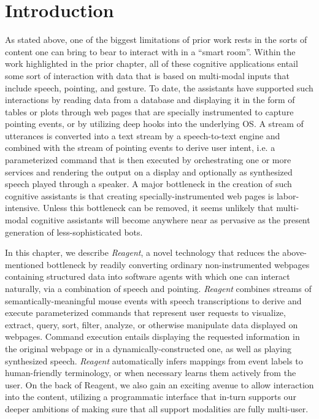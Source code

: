 \section{Introduction}

As stated above, one of the biggest limitations of prior work rests
in the sorts of content one can bring to bear to interact with in a
``smart room''. Within the work highlighted in the prior chapter,
all of these cognitive applications entail some sort of interaction
with data that is based on multi-modal inputs that include speech,
pointing, and gesture. To date, the assistants have  supported such
interactions by reading data from a database and displaying it in
the form of tables or  plots through web pages that are specially
instrumented to capture pointing events, or by utilizing deep hooks
into the underlying OS. A stream of utterances  is converted into a
text stream by a speech-to-text engine and combined with the stream
of pointing events  to derive user intent, i.e. a parameterized
command that is then executed by orchestrating one or more services 
and rendering the output on a display and optionally as synthesized
speech played through a speaker. A major bottleneck in the creation
of such cognitive assistants is that creating specially-instrumented
web  pages is labor-intensive. Unless this bottleneck can be
removed, it seems unlikely that multi-modal cognitive assistants
will become anywhere near as pervasive as the present generation
of less-sophisticated bots.

In this chapter, we describe \textit{Reagent}, a novel technology
that reduces the above-mentioned bottleneck by readily converting
ordinary non-instrumented webpages containing structured data into
software agents with which one can interact naturally, via a
combination of speech and pointing. \textit{Reagent} combines streams
of semantically-meaningful mouse events with speech transcriptions
to derive and execute parameterized commands that represent user
requests to visualize, extract, query, sort, filter, analyze, or
otherwise manipulate data displayed on webpages. Command execution
entails displaying the requested information in the original webpage
or in a dynamically-constructed one, as well as playing synthesized
speech. \textit{Reagent} automatically infers mappings from event
labels to human-friendly terminology, or when necessary learns them
actively from the user. On the back of Reagent, we also gain
an exciting avenue to allow interaction into the content, utilizing
a programmatic interface that in-turn supports our deeper ambitions
of making sure that all support modalities are fully multi-user.

